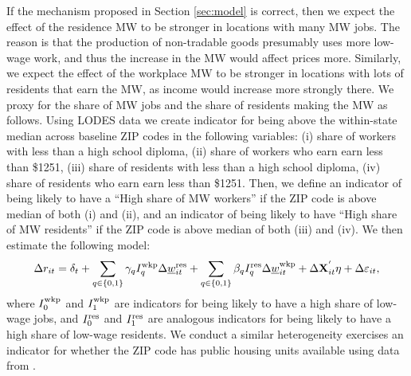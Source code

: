 If the mechanism proposed in Section \ref{sec:model} is correct, then we
expect the effect of the residence MW to be stronger in locations with many 
MW jobs.
The reason is that the production of non-tradable goods presumably uses more
low-wage work, and thus the increase in the MW would affect prices more.
Similarly, we expect the effect of the workplace MW to be stronger in locations
with lots of residents that earn the MW, as income would increase more strongly 
there.
We proxy for the share of MW jobs and the share of residents making the MW as follows.
Using LODES data we create indicator for being above the within-state 
median across baseline ZIP codes in the following variables: (i) share of workers 
with less than a high school diploma, (ii) share of workers who earn earn less 
than \$1251, (iii) share of residents with less than a high school diploma, (iv) 
share of residents who earn earn less than \$1251.
Then, we define an indicator of being likely to have a ``High share of MW workers'' 
if the ZIP code is above median of both (i) and (ii), and an indicator of being likely 
to have ``High share of MW residents'' if the ZIP code is above median of both (iii) and 
(iv). We then estimate the following model:
\begin{equation}\label{eq:fd_heterogeneity}
    \Delta r_{it} = \delta_t
                  + \sum_{q\in\{0,1\}}\gamma_q I^{\text{wkp}}_q \Delta \underline{w}^{\text{res}}_{it}
                  + \sum_{q\in\{0,1\}}\beta_q I^{\text{res}}_q \Delta \underline{w}^{\text{wkp}}_{it}
                  + \Delta \mathbf{X}^{'}_{it}\eta
                  + \Delta \varepsilon_{it} ,
\end{equation}
where 
$I^{\text{wkp}}_0$ and $I^{\text{wkp}}_1$ are indicators for being likely to have a
high share of low-wage jobs, and
$I^{\text{res}}_0$ and $I^{\text{res}}_1$ are analogous indicators for being likely to 
have a high share of low-wage residents.
We conduct a similar heterogeneity exercises an indicator for whether the ZIP
code has public housing units available using data from \textcite{hudHousing}.
